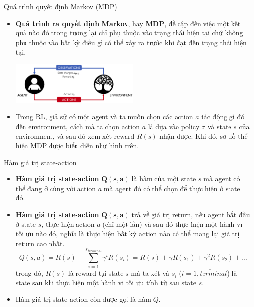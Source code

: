 \documentclass[10pt,aspectratio=169]{beamer}
\begin{document}
\begin{frame}{Quá trình quyết định Markov (MDP)}{\subsecname}
\begin{itemize}
\setlength\itemsep{8pt}
\item \textbf{Quá trình ra quyết định Markov}, hay \textbf{MDP}, đề cập đến việc một kết quả nào đó trong tương lại chỉ phụ thuộc vào trạng thái hiện tại chứ không phụ thuộc vào bất kỳ điều gì có thể xảy ra trước khi đạt đến trạng thái hiện tại.\\
\vspace{8pt}
\begin{center}
\includegraphics[width=0.5\textwidth]{source/7.png}\\
\end{center}
\item Trong RL, giả sử có một agent và ta muốn chọn các action $ a $ tác động gì đó đến environment, cách mà ta chọn action $ a $ là dựa vào policy $ \pi $ và state $ s $ của environment, và sau đó xem xét reward $ R(s) $ nhận được. Khi đó, sơ đồ thể hiện MDP được biểu diễn như hình trên.
\end{itemize}
\end{frame}

\begin{frame}{Hàm giá trị state-action}
\begin{itemize}
\setlength\itemsep{8pt}
\item \textbf{Hàm giá trị state-action $ \boldsymbol{Q(s,a)} $} là hàm của một state $ s $ mà agent có thể đang ở cùng với action $ a $ mà agent đó có thể chọn để thực hiện ở state đó.
\item \textbf{Hàm giá trị state-action $ \boldsymbol{Q(s,a)} $} trả về giá trị return, nếu agent bắt đầu ở state $ s $, thực hiện action $ a $ (chỉ một lần) và sau đó thực hiện một hành vi tối ưu nào đó, nghĩa là thực hiện bất kỳ action nào có thể mang lại giá trị return cao nhất.
\begin{equation*}
Q(s,a) = R(s) + \sum_{i=1}^{s_{terminal}} \gamma^i R(s_i) = R(s) + \gamma R(s_1) + \gamma^2 R(s_2) + ...
\end{equation*}
trong đó, $ R(s) $ là reward tại state $ s $ mà ta xét và $ s_{i} $ ($ i = \overline{1,terminal} $) là state sau khi thực hiện một hành vi tối ưu tính từ sau state $ s $.
\item Hàm giá trị state-action còn được gọi là hàm $ Q $.
\end{itemize}
\end{frame}
\end{document}

